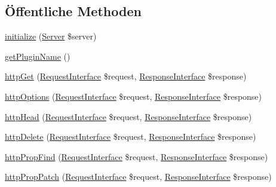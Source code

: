 \subsection*{Öffentliche Methoden}
\begin{DoxyCompactItemize}
\item 
\mbox{\hyperlink{class_sabre_1_1_d_a_v_1_1_core_plugin_a102ff01defea5fc5b4a6b1048b98af5a}{initialize}} (\mbox{\hyperlink{class_sabre_1_1_d_a_v_1_1_server}{Server}} \$server)
\item 
\mbox{\hyperlink{class_sabre_1_1_d_a_v_1_1_core_plugin_a8f1937736320fe94cf5403287f2fb6bf}{get\+Plugin\+Name}} ()
\item 
\mbox{\hyperlink{class_sabre_1_1_d_a_v_1_1_core_plugin_ae9bee66d9b3811aaf5730893ac62a52c}{http\+Get}} (\mbox{\hyperlink{interface_sabre_1_1_h_t_t_p_1_1_request_interface}{Request\+Interface}} \$request, \mbox{\hyperlink{interface_sabre_1_1_h_t_t_p_1_1_response_interface}{Response\+Interface}} \$response)
\item 
\mbox{\hyperlink{class_sabre_1_1_d_a_v_1_1_core_plugin_aebb5d53bf8d6485f7200aa8590911125}{http\+Options}} (\mbox{\hyperlink{interface_sabre_1_1_h_t_t_p_1_1_request_interface}{Request\+Interface}} \$request, \mbox{\hyperlink{interface_sabre_1_1_h_t_t_p_1_1_response_interface}{Response\+Interface}} \$response)
\item 
\mbox{\hyperlink{class_sabre_1_1_d_a_v_1_1_core_plugin_a19e0c6de1fc0e8360dca706f51638fcf}{http\+Head}} (\mbox{\hyperlink{interface_sabre_1_1_h_t_t_p_1_1_request_interface}{Request\+Interface}} \$request, \mbox{\hyperlink{interface_sabre_1_1_h_t_t_p_1_1_response_interface}{Response\+Interface}} \$response)
\item 
\mbox{\hyperlink{class_sabre_1_1_d_a_v_1_1_core_plugin_acf6e138419c7cd065ec03df88cdb661e}{http\+Delete}} (\mbox{\hyperlink{interface_sabre_1_1_h_t_t_p_1_1_request_interface}{Request\+Interface}} \$request, \mbox{\hyperlink{interface_sabre_1_1_h_t_t_p_1_1_response_interface}{Response\+Interface}} \$response)
\item 
\mbox{\hyperlink{class_sabre_1_1_d_a_v_1_1_core_plugin_ab25a596abbd1294031684d396cc36457}{http\+Prop\+Find}} (\mbox{\hyperlink{interface_sabre_1_1_h_t_t_p_1_1_request_interface}{Request\+Interface}} \$request, \mbox{\hyperlink{interface_sabre_1_1_h_t_t_p_1_1_response_interface}{Response\+Interface}} \$response)
\item 
\mbox{\hyperlink{class_sabre_1_1_d_a_v_1_1_core_plugin_ad9ea70e9500670dd7e41928a36a032be}{http\+Prop\+Patch}} (\mbox{\hyperlink{interface_sabre_1_1_h_t_t_p_1_1_request_interface}{Request\+Interface}} \$request, \mbox{\hyperlink{interface_sabre_1_1_h_t_t_p_1_1_response_interface}{Response\+Interface}} \$response)

\end{DoxyCompactItemize}
